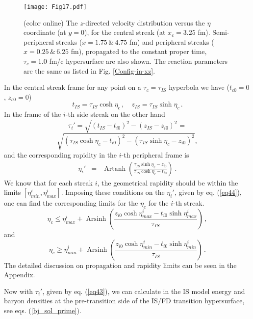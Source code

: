 \documentclass[aps,prc,twocolumn,floatfix,showpacs,a4paper,
nofootinbib,amsmath,amssymb]{revtex4-1}
\newcommand{\be}{\begin{equation}}
\newcommand{\ee}{\end{equation}}
\newcommand{\ba}{\begin{eqnarray}}
\newcommand{\ea}{\end{eqnarray}}
\DeclareMathOperator{\Artanh}{Artanh}
\DeclareMathOperator{\Arsinh}{Arsinh}
\begin{document}
\begin{figure}[htb]     %
\begin{center}
\resizebox{1.01\columnwidth}{!}
{\texttt{[image: Fig17.pdf]}}
\caption{ (color online)
The $z$-directed velocity distribution versus the $\eta$ coordinate 
(at $y = 0$),
for the central streak (at $x_c = 3.25$ fm). Semi-peripheral streaks 
($x = 1.75 \, \& \, 4.75$ fm) 
and peripheral streaks ($x = 0.25 \, \& \,6.25$ fm), 
propagated to the constant proper time, $\tau_{c} = 1.0$ fm/c 
hypersurface are also shown.
The reaction parameters are the same as 
listed in Fig. \ref{Config-in-xz}.
}
\label{Tauf-v-e}
\end{center}
\end{figure}        %

In the central streak frame for any point on a $\tau_c = \tau_{IS}$ hyperbola we have ($t_{c0}=0$, $z_{c0}=0$)
\be
t_{IS} = \tau_{IS}\cosh \eta_c\,, \quad 
z_{IS}= \tau_{IS} \sinh \eta_c\,.
\label{deftz}
\ee
In the frame of the $i$-th side streak on the other hand
$$
\tau_i ' = \sqrt{\!\left( t_{IS} - t_{i0} \right)^{2}\! -      
      \!\left( z_{IS} - z_{i0} \right)^{2} } =
$$
\be
    \sqrt{\!\left( \tau_{IS} \cosh \eta_c - t_{i0} \right)^{2}\! -      
      \!\left( \tau_{IS} \sinh \eta_c - z_{i0} \right)^{2} }\! ,
\label{eq43}
\ee
and the corresponding rapidity in the $i$-th peripheral
frame is
\ba
\eta_i ' &=& 
      \Artanh\left(\frac{\tau_{IS} \sinh \eta_c - z_{i0}}{\tau_{IS} \cosh \eta_c - t_{i0}}	
\right) \ .
\label{eq44}
\ea
We know that for each streak $i$, the geometrical rapidity should be within 
the limits $[\eta_{min}^i,\eta_{max}^i]$. 
Imposing these conditions on the $\eta_i '$, given by eq. (\ref{eq44}), one can find the corresponding limits for the $\eta_c$ for the $i$-th streak. 
\be
\eta_c  \leq \eta_{max}^{i} + \Arsinh \left(\frac
{z_{i0} \cosh \eta_{max}^{i} - t_{i0} \sinh \eta_{max}^{i}}{\tau_{IS}}
\right) \,,
\label{eq48}
\ee
and
\be
\eta_c  \geq \eta_{min}^{i} + \Arsinh \left(\frac
{z_{i0} \cosh \eta_{min}^{i}  - t_{i0} \sinh \eta_{min}^{i}}{\tau_{IS}}
\right) \,.
\label{eq49}
\ee
The detailed discussion on propagation and rapidity limits can be seen 
in the Appendix.


Now with $\tau_i '$, given by eq. (\ref{eq43}), we can calculate in the IS model
energy and baryon densities
at the pre-transition
side of the IS/FD transition hypersurface, see eqs. (\ref{bj_sol_prime}). 
\end{document}
